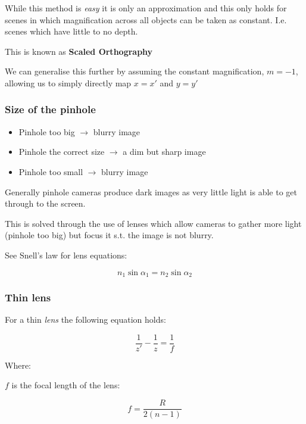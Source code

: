 \documentclass{beamer}
\begin{document}
\begin{frame}[allowframebreaks]
\begin{itemize}
            While this method is \textit{easy} it is only an approximation and this only holds for scenes in which magnification across all objects can be taken as constant. I.e. scenes which have little to no depth.

            This is known as \textbf{Scaled Orthography}

            \framebreak

            We can generalise this further by assuming the constant magnification, $m=-1$, allowing us to simply directly map $x = x'$ and $y = y'$
    \end{itemize}
  \end{frame}

  \begin{frame}
    \frametitle{Size of the pinhole}
    \begin{itemize}
      \item Pinhole too big $\rightarrow$ blurry image
      \item Pinhole the correct size \(\rightarrow\) a dim but sharp image
      \item Pinhole too small \(\rightarrow\) blurry image
    \end{itemize}

    Generally pinhole cameras produce dark images as very little light is able to get through to the screen.

    This is solved through the use of lenses which allow cameras to gather more light (pinhole too big) but focus it s.t. the image is not blurry.

    See Snell's law for lens equations:

    \[
      n_{1}\sin \alpha_{1} = n_{2} \sin \alpha_{2}
    \]

  \end{frame}

  \begin{frame}
    \frametitle{Thin lens}
    For a thin \textit{lens} the following equation holds:

    \[
      \frac{1}{z'} - \frac{1}{z} = \frac{1}{f}
    \]

    Where:

    $f$ is the focal length of the lens:

    \[
      f = \frac{R}{2(n-1)}
    \]


  \end{frame}
\end{document}
